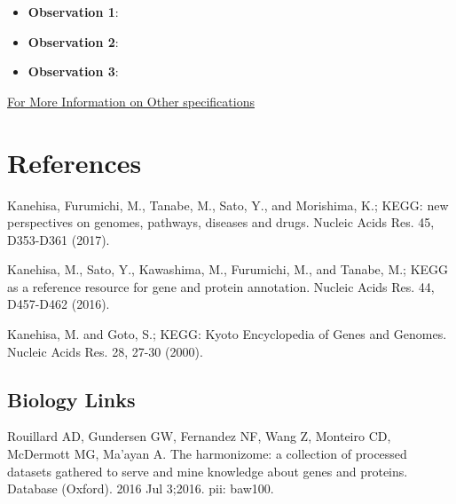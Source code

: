 	\vspace{8pt}
	\begin{itemize}
		\item \textbf{Observation 1}: 
		\item \textbf{Observation 2}:
		\item \textbf{Observation 3}:  
	\end{itemize}
	\href{CONTROL LINK GOES HERE}{For More Information on Other specifications}	
		
\section{References}



\begin{thebibliography}{00}

 Kanehisa, Furumichi, M., Tanabe, M., Sato, Y., and Morishima, K.; 
\newblock KEGG: new perspectives on genomes, pathways, diseases and drugs. 
\newblock Nucleic Acids Res. 45, D353-D361 (2017).

 Kanehisa, M., Sato, Y., Kawashima, M., Furumichi, M., and Tanabe, M.; 
\newblock KEGG as a reference resource for gene and protein annotation. 
\newblock Nucleic Acids Res. 44, D457-D462 (2016).

 Kanehisa, M. and Goto, S.; 
\newblock KEGG: Kyoto Encyclopedia of Genes and Genomes. 
\newblock Nucleic Acids Res. 28, 27-30 (2000). 

\subsection{Biology Links}

 Rouillard AD, Gundersen GW, Fernandez NF, Wang Z, Monteiro CD, McDermott MG, Ma'ayan A. 
\newblock The harmonizome: a collection of processed datasets gathered to serve and mine knowledge about genes and proteins. 
\newblock Database (Oxford). 2016 Jul 3;2016. pii: baw100. 


\end{thebibliography}

